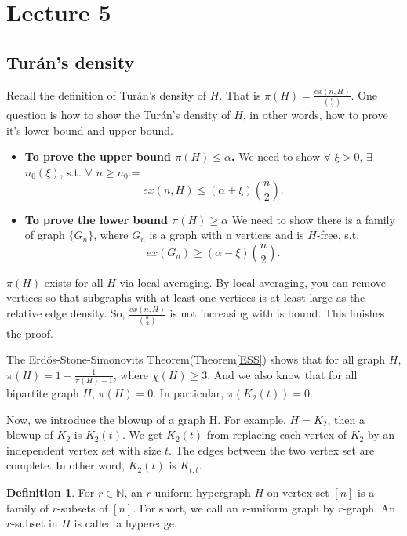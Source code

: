 \documentclass{article}
\theoremstyle{definition}
\newtheorem{definition}[theorem]{Definition}
\def\Erdos{Erd\H{o}s}
\def\Turan{Tur\'an}
\begin{document}
\newpage

\section{Lecture 5}

\subsection{\Turan{}'s density}

Recall the definition of \Turan{}'s density of $H$. That is  $\pi(H)=\frac{ex(n,H)}{\binom{n}{2}}$. One question is how to show the \Turan{}'s density of $H$, in other words, how to prove it's lower bound and upper bound.

\begin{itemize}
    \item \textbf{To prove the upper bound $\pi(H)\leq\alpha$.}
    We need to show $\forall$ $\xi> 0$, $\exists$ $n_0(\xi)$, s.t. 
$\forall$ $n\geq n_0$.=
\begin{equation*}
    ex(n,H)\leq(\alpha+\xi)\binom{n}{2}.
\end{equation*}
\item \textbf{To prove the lower bound $\pi(H)\geq\alpha$}
    We need to show there is a family of graph $\{G_n\}$, where $G_n$ is a graph with n vertices and is $H$-free, s.t.
\begin{equation*}
    ex(G_n)\geq(\alpha-\xi)\binom{n}{2}.
\end{equation*}
\end{itemize}

$\pi(H)$ exists for all $H$ via local averaging. By local averaging, you can remove vertices so that subgraphs with at least one vertices  is at least large as the relative edge density. So, $\frac{ex(n,H)}{\binom{n}{2}}$ is not increasing with is bound. This finishes the proof.

The \Erdos{}-Stone-Simonovits Theorem(Theorem\ref{ESS}) shows that for all graph $H$, $\pi(H)=1-\frac{1}{\pi(H)-1}$, where $\chi(H)\geq 3$. And we also know that for all bipartite graph $H$, $\pi(H)=0$. In particular, $\pi(K_2(t))=0$. 

Now, we introduce the blowup of a graph H. For example, $H=K_2$, then a blowup of $K_2$ is $K_2(t)$. We get $K_2(t)$ from replacing each vertex of $K_2$ by an independent vertex set with size $t$. The edges between the two vertex set are complete. In other word, $K_2(t)$ is $K_{t,t}$.

\begin{definition}
   For $r\in \mathbb{N}$, an $r$-uniform hypergraph $H$ on vertex set $[n]$ is a family of $r$-subsets of $[n]$. For short, we call an $r$-uniform graph by $r$-graph. An $r$-subset in $H$ is called a hyperedge.
\end{definition}
\end{document}
